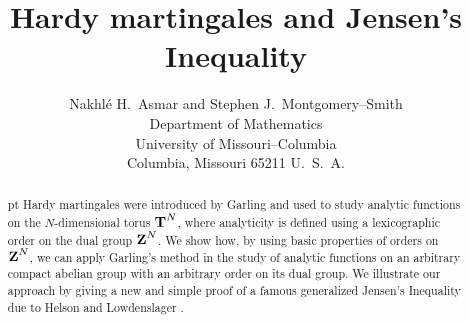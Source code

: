 \setlength\textwidth{6in}
\setlength\oddsidemargin{.45in}
\topmargin -20mm
\textheight 54pc
\def\Bbb#1{{\mathchoice{\mbox{\bf #1}}{\mbox{\bf #1}}%
{\mbox{$\scriptstyle \bf #1$}}{\mbox{$\scriptscriptstyle \bf #1$}}}}
\def\N{\Bbb N}
\def\R{\Bbb R}
\def\C{\Bbb C}
\def\D{\Bbb D}
\def\Z{\Bbb Z}
\def\T{\Bbb T}
\def\Q{\Bbb Q}
\def\E{\Bbb E}
\def\O{\Omega}
\def\sgn{{\rm sgn}}
\def\supp{{\rm supp}}
\def\H{{\cal H}_P}
\def\e{\epsilon}
\def\A{{\cal A}}
\def\cL{{\cal L}}
\def\cC{{\cal C}}
\def\cB{{\cal B}}
\def\cF{{\cal F}}
\def\cT{{\cal T}}
\def\cI{{\cal I}}
\def\cP{{\cal P}}
\def\cR{{\cal R}}
\def\Linfg{L^\infty (G)}
\def\Hinfg{H^\infty (G)}
\def\sgn{{\rm sgn}}
\def\cMT{{\cal M}_T(\Sigma)}
\def\cMTalpha{{\cal M}_{T_{x+\phi_\alpha}}(\Sigma)}
\def\Re{\mathop{\hbox{\rm Re}}}


\title{Hardy martingales and Jensen's Inequality}
\author{Nakhl\'e H.\ Asmar
 and 
 Stephen J.\ Montgomery--Smith\\
Department of Mathematics\\
University of
Missouri--Columbia\\
Columbia, Missouri 65211  U.\ S.\ A.
}
\date{}
\maketitle
\begin{abstract}
 pt
Hardy martingales were introduced by Garling
and used to study analytic functions on 
the $N$-dimensional torus $\T^N$,
where analyticity is defined using a
lexicographic order on the dual group $\Z^N$.
We show how, by using basic properties of orders on
$\Z^N$, we can apply Garling's method in
the study of analytic functions on
an arbitrary compact abelian group with an arbitrary
order on its dual group.  We illustrate
our approach by giving a new and simple proof
of a famous generalized Jensen's Inequality due to
Helson and Lowdenslager \cite{hl1}.
\end{abstract}

